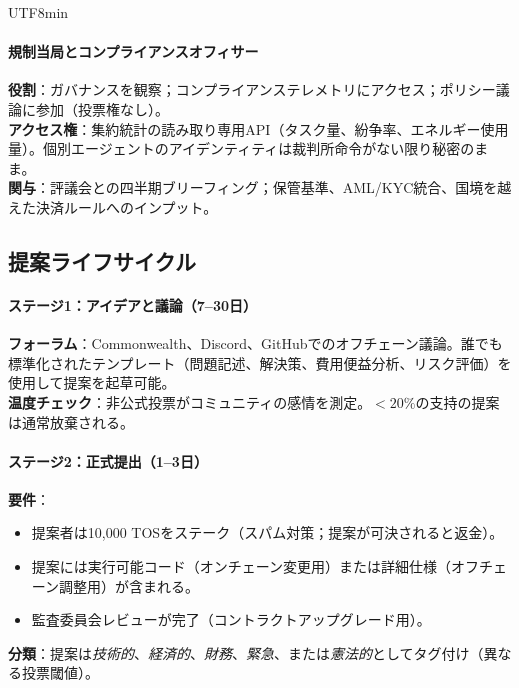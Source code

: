 \documentclass[11pt]{article}
\begin{document}
\begin{CJK}{UTF8}{min}
\begin{itemize}[noitemsep]
\paragraph{規制当局とコンプライアンスオフィサー}
\textbf{役割}：ガバナンスを観察；コンプライアンステレメトリにアクセス；ポリシー議論に参加（投票権なし）。\\
\textbf{アクセス権}：集約統計の読み取り専用API（タスク量、紛争率、エネルギー使用量）。個別エージェントのアイデンティティは裁判所命令がない限り秘密のまま。\\
\textbf{関与}：評議会との四半期ブリーフィング；保管基準、AML/KYC統合、国境を越えた決済ルールへのインプット。

\subsection{提案ライフサイクル}

\paragraph{ステージ1：アイデアと議論（7--30日）}
\textbf{フォーラム}：Commonwealth、Discord、GitHubでのオフチェーン議論。誰でも標準化されたテンプレート（問題記述、解決策、費用便益分析、リスク評価）を使用して提案を起草可能。\\
\textbf{温度チェック}：非公式投票がコミュニティの感情を測定。$<20\%$の支持の提案は通常放棄される。

\paragraph{ステージ2：正式提出（1--3日）}
\textbf{要件}：
\begin{itemize}[noitemsep]
  \item 提案者は10,000 TOSをステーク（スパム対策；提案が可決されると返金）。
  \item 提案には実行可能コード（オンチェーン変更用）または詳細仕様（オフチェーン調整用）が含まれる。
  \item 監査委員会レビューが完了（コントラクトアップグレード用）。
\end{itemize}
\textbf{分類}：提案は\emph{技術的}、\emph{経済的}、\emph{財務}、\emph{緊急}、または\emph{憲法的}としてタグ付け（異なる投票閾値）。


\end{itemize}
\end{CJK}
\end{document}
